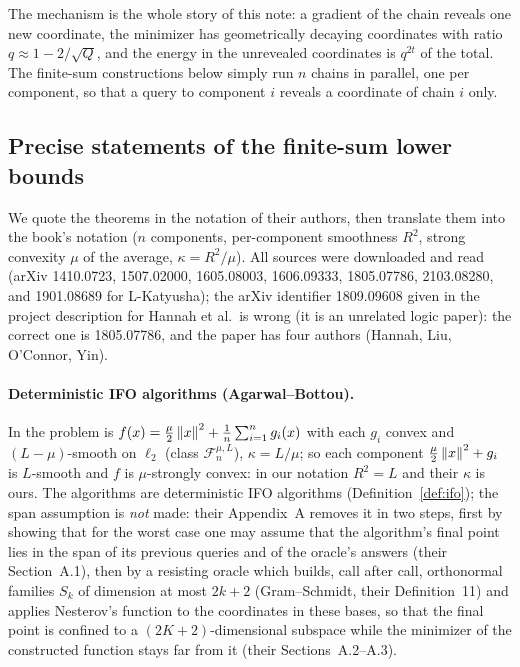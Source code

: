 The mechanism is the whole story of this note: a gradient of the chain reveals one new coordinate, the minimizer has geometrically decaying coordinates with ratio $q\approx1-2/\sqrt Q$, and the energy in the unrevealed coordinates is $q^{2t}$ of the total. The finite-sum constructions below simply run $n$ chains in parallel, one per component, so that a query to component $i$ reveals a coordinate of chain $i$ only.
\subsection{Precise statements of the finite-sum lower bounds}
\label{sec:lb:statements}

We quote the theorems in the notation of their authors, then translate them into the book's notation ($n$ components, per-component smoothness $R^2$, strong convexity $\mu$ of the average, $\kappa=R^2/\mu$). All sources were downloaded and read (arXiv 1410.0723, 1507.02000, 1605.08003, 1606.09333, 1805.07786, 2103.08280, and 1901.08689 for L-Katyusha); the arXiv identifier 1809.09608 given in the project description for Hannah et al.\ is wrong (it is an unrelated logic paper): the correct one is 1805.07786, and the paper has four authors (Hannah, Liu, O'Connor, Yin).

\paragraph{Deterministic IFO algorithms (Agarwal--Bottou).}
In \cite{agarwal2015lower} the problem is $f(x)=\frac\mu2\left\|x\right\|^2+\frac1n\sum_{i=1}^n g_i(x)$ with each $g_i$ convex and $(L-\mu)$-smooth on $\ell_2$ (class $\mathcal F_n^{\mu,L}$), $\kappa=L/\mu$; so each component $\frac\mu2\left\|x\right\|^2+g_i$ is $L$-smooth and $f$ is $\mu$-strongly convex: in our notation $R^2=L$ and their $\kappa$ is ours. The algorithms are deterministic IFO algorithms (Definition~\ref{def:ifo}); the span assumption is \emph{not} made: their Appendix~A removes it in two steps, first by showing that for the worst case one may assume that the algorithm's final point lies in the span of its previous queries and of the oracle's answers (their Section~A.1), then by a resisting oracle which builds, call after call, orthonormal families $S_k$ of dimension at most $2k+2$ (Gram--Schmidt, their Definition~11) and applies Nesterov's function to the coordinates in these bases, so that the final point is confined to a $(2K+2)$-dimensional subspace while the minimizer of the constructed function stays far from it (their Sections~A.2--A.3).

